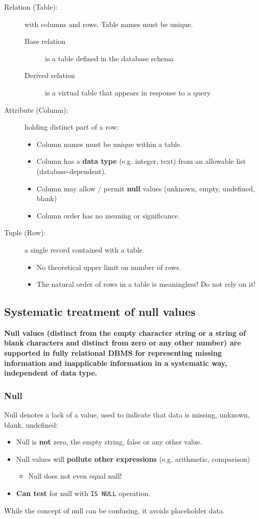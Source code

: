 \documentclass[slides]{pgnotes}
\begin{document}
\begin{description}
\item[Relation (Table):] with columns and rows. Table names must be unique.
  \begin{description}
  \item[Base relation] is a table defined in the database schema
  \item[Derived relation] is a virtual table that appears in response to a query
  \end{description}
\item[Attribute (Column):] holding distinct part of a row: 
  \begin{itemize}
  \item Column names must be unique within a table.
  \item Column has a \textbf{data type} (e.g. integer, text) from an allowable list (database-dependent).
  \item Column may allow / permit \textbf{null} values (unknown, empty, undefined, blank)
  \item Column order has no meaning or significance.
  \end{itemize}
\item[Tuple (Row):] a single record contained with a table.
  \begin{itemize}
  \item No theoretical upper limit on number of rows.
  \item The natural order of rows in a table is meaningless!  Do not rely on it!
  \end{itemize}
\end{description}

\subsection{Systematic treatment of null values}
  \textbf{Null values (distinct from the empty character string or a string of blank characters and distinct from zero or any other number) are supported in fully relational DBMS for representing missing information and inapplicable information in a systematic way, independent of data type.}

\subsubsection{Null}

Null denotes a lack of a value, used to indicate that data is missing, unknown, blank, undefined:
\begin{itemize}
\item Null is \textbf{not} zero, the empty string, false or any other value.
\item Null values will \textbf{pollute other expressions} (e.g. arithmetic, comparison)
  \begin{itemize}
  \item Null does not even equal null!
  \end{itemize}
\item \textbf{Can test} for null with \texttt{IS NULL} operation.
\end{itemize}
While the concept of null can be confusing, it avoids placeholder data.
\end{document}
